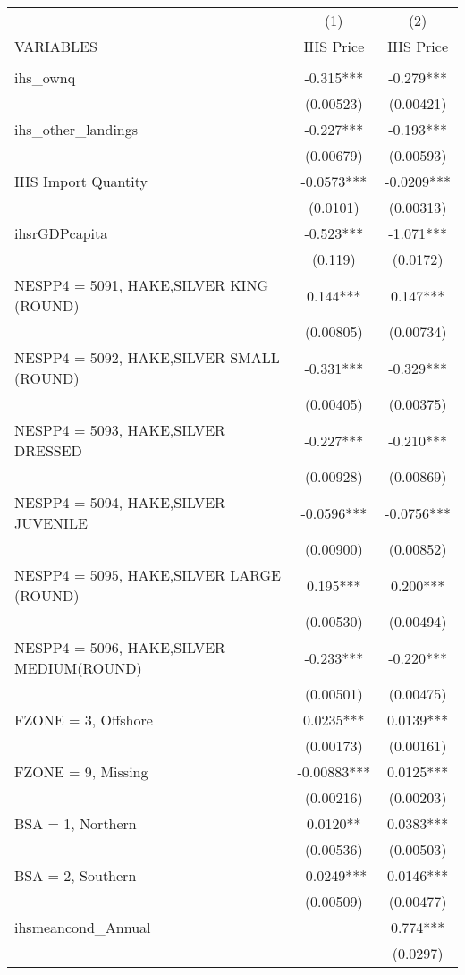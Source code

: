 \begin{tabular}{lcc} \hline
 & (1) & (2) \\
VARIABLES & IHS Price & IHS Price \\ \hline
 &  &  \\
ihs\_ownq & -0.315*** & -0.279*** \\
 & (0.00523) & (0.00421) \\
ihs\_other\_landings & -0.227*** & -0.193*** \\
 & (0.00679) & (0.00593) \\
IHS Import Quantity & -0.0573*** & -0.0209*** \\
 & (0.0101) & (0.00313) \\
ihsrGDPcapita & -0.523*** & -1.071*** \\
 & (0.119) & (0.0172) \\
NESPP4 = 5091, HAKE,SILVER KING (ROUND) & 0.144*** & 0.147*** \\
 & (0.00805) & (0.00734) \\
NESPP4 = 5092, HAKE,SILVER SMALL (ROUND) & -0.331*** & -0.329*** \\
 & (0.00405) & (0.00375) \\
NESPP4 = 5093, HAKE,SILVER DRESSED & -0.227*** & -0.210*** \\
 & (0.00928) & (0.00869) \\
NESPP4 = 5094, HAKE,SILVER JUVENILE & -0.0596*** & -0.0756*** \\
 & (0.00900) & (0.00852) \\
NESPP4 = 5095, HAKE,SILVER LARGE (ROUND) & 0.195*** & 0.200*** \\
 & (0.00530) & (0.00494) \\
NESPP4 = 5096, HAKE,SILVER MEDIUM(ROUND) & -0.233*** & -0.220*** \\
 & (0.00501) & (0.00475) \\
FZONE = 3, Offshore & 0.0235*** & 0.0139*** \\
 & (0.00173) & (0.00161) \\
FZONE = 9, Missing & -0.00883*** & 0.0125*** \\
 & (0.00216) & (0.00203) \\
BSA = 1, Northern & 0.0120** & 0.0383*** \\
 & (0.00536) & (0.00503) \\
BSA = 2, Southern & -0.0249*** & 0.0146*** \\
 & (0.00509) & (0.00477) \\
ihsmeancond\_Annual &  & 0.774*** \\
 &  & (0.0297) \\

\end{tabular}
